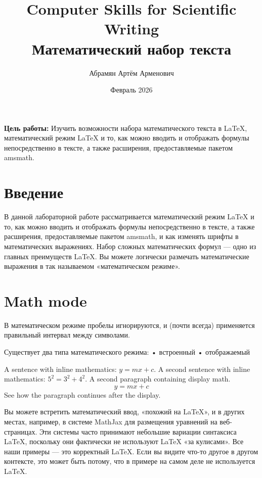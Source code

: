 \documentclass[leqno]{article}
\title{Computer Skills for Scientific Writing\\Математический набор текста}
\author{Абрамян Артём Арменович}
\date{Февраль 2026}
\begin{document}
  \maketitle
  \pagebreak

  \textbf{Цель работы:} Изучить возможности набора математического текста в LaTeX, математический режим LaTeX и то, как можно вводить и отображать формулы непосредственно в тексте, а также расширения, предоставляемые пакетом amsmath.\smallskip

  \section{Введение}
  \label{sec:intro}
  

  В данной лабораторной работе рассматривается математический режим LaTeX и то, как можно вводить и отображать формулы непосредственно в тексте, а также расширения, предоставляемые пакетом amsmath, и как изменять шрифты в математических выражениях.
  Набор сложных математических формул — одно из главных преимуществ LaTeX. Вы можете логически размечать математические выражения в так называемом «математическом режиме».
  
  \section{Math mode}
  \label{sec:mode}
  
  В математическом режиме пробелы игнорируются, и (почти всегда) применяется правильный интервал между символами.

  Существует два типа математического режима:
  • встроенный
  • отображаемый


    \begin{center}
      A sentence with inline mathematics: $y = mx + c$.
      A second sentence with inline mathematics:
      $5^{2}=3^{2}+4^{2}$.
      A second paragraph containing display math.
      \[
      y = mx + c
      \]
      See how the paragraph continues after the display.
    \end{center}

    Вы можете встретить математический ввод, «похожий на LaTeX», и в других местах, например, в системе MathJax для размещения уравнений на веб-страницах. Эти системы часто принимают небольшие вариации синтаксиса LaTeX, поскольку они фактически не используют LaTeX «за кулисами».
    Все наши примеры — это корректный LaTeX. Если вы видите что-то другое в другом контексте, это может быть потому, что в примере на самом деле не используется LaTeX.
\end{document}
